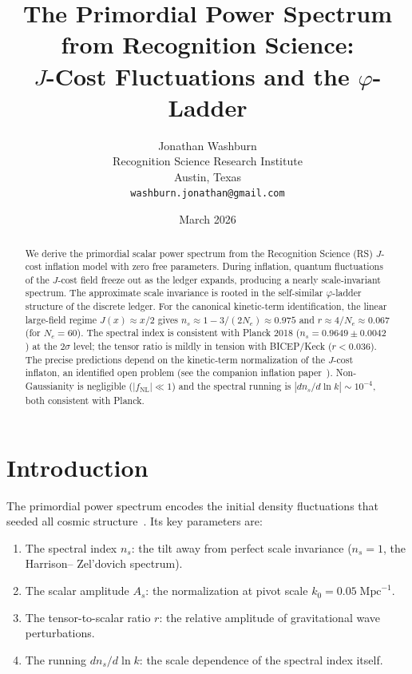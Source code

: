 \documentclass[12pt,a4paper]{article}
\title{The Primordial Power Spectrum from Recognition Science:\\
$J$-Cost Fluctuations and the $\varphi$-Ladder}
\author{Jonathan Washburn\\
Recognition Science Research Institute\\
Austin, Texas\\
\texttt{washburn.jonathan@gmail.com}}
\date{March 2026}
\theoremstyle{definition}
\theoremstyle{remark}
\begin{document}
\maketitle

\begin{abstract}
We derive the primordial scalar power spectrum from the
Recognition Science (RS) $J$-cost inflation model with zero
free parameters.  During inflation, quantum fluctuations of
the $J$-cost field freeze out as the ledger expands,
producing a nearly scale-invariant spectrum.  The approximate
scale invariance is rooted in the self-similar $\varphi$-ladder
structure of the discrete ledger.  For the canonical
kinetic-term identification, the linear large-field regime
$J(x) \approx x/2$ gives $n_s \approx 1 - 3/(2N_e) \approx
0.975$ and $r \approx 4/N_e \approx 0.067$ (for $N_e = 60$).
The spectral index is consistent with Planck 2018
($n_s = 0.9649 \pm 0.0042$) at the $2\sigma$ level; the
tensor ratio is mildly in tension with BICEP/Keck
($r < 0.036$).  The precise predictions depend on the
kinetic-term normalization of the $J$-cost inflaton, an
identified open problem (see the companion inflation
paper~\cite{RSInflation}).  Non-Gaussianity is negligible
($|f_{\mathrm{NL}}| \ll 1$) and the spectral running is
$|dn_s/d\ln k| \sim 10^{-4}$, both consistent with Planck.
\end{abstract}

\section{Introduction}
\label{sec:intro}

The primordial power spectrum encodes the initial density
fluctuations that seeded all cosmic
structure~\cite{Planck2020}.  Its key parameters are:
\begin{enumerate}[nosep]
  \item The spectral index $n_s$: the tilt away from
  perfect scale invariance ($n_s = 1$, the Harrison--
  Zel'dovich spectrum).
  \item The scalar amplitude $A_s$: the normalization at
  pivot scale $k_0 = 0.05\;\mathrm{Mpc}^{-1}$.
  \item The tensor-to-scalar ratio $r$: the relative
  amplitude of gravitational wave perturbations.
  \item The running $dn_s/d\ln k$: the scale dependence
  of the spectral index itself.
\end{enumerate}
\end{document}
